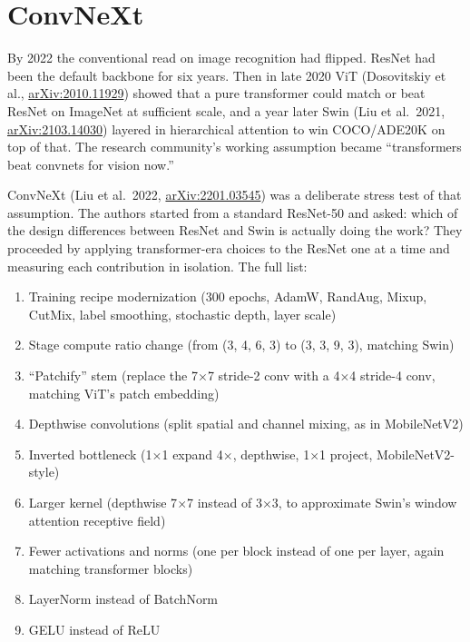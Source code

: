\chapter{ConvNeXt}
\label{chap:layernorm}


By 2022 the conventional read on image recognition had flipped.
ResNet had been the default backbone for six years. Then in late
2020 ViT (Dosovitskiy et al.,
\href{https://arxiv.org/abs/2010.11929}{arXiv:2010.11929}) showed
that a pure transformer could match or beat ResNet on ImageNet at
sufficient scale, and a year later Swin (Liu et al.\ 2021,
\href{https://arxiv.org/abs/2103.14030}{arXiv:2103.14030}) layered
in hierarchical attention to win COCO/ADE20K on top of that. The
research community's working assumption became ``transformers
beat convnets for vision now.''

ConvNeXt (Liu et al.\ 2022,
\href{https://arxiv.org/abs/2201.03545}{arXiv:2201.03545}) was a
deliberate stress test of that assumption. The authors started
from a standard ResNet-50 and asked: which of the design
differences between ResNet and Swin is actually doing the work?
They proceeded by applying transformer-era choices to the
ResNet one at a time and measuring each contribution
in isolation. The full list:

\begin{enumerate}
\item Training recipe modernization (300 epochs, AdamW, RandAug,
  Mixup, CutMix, label smoothing, stochastic depth, layer scale)
\item Stage compute ratio change (from (3, 4, 6, 3) to (3, 3, 9, 3),
  matching Swin)
\item ``Patchify'' stem (replace the 7$\times$7 stride-2 conv with
  a 4$\times$4 stride-4 conv, matching ViT's patch embedding)
\item Depthwise convolutions (split spatial and channel mixing, as
  in MobileNetV2)
\item Inverted bottleneck (1$\times$1 expand 4$\times$, depthwise,
  1$\times$1 project, MobileNetV2-style)
\item Larger kernel (depthwise 7$\times$7 instead of 3$\times$3, to
  approximate Swin's window attention receptive field)
\item Fewer activations and norms (one per block instead of one
  per layer, again matching transformer blocks)
\item LayerNorm instead of BatchNorm
\item GELU instead of ReLU
\end{enumerate}

